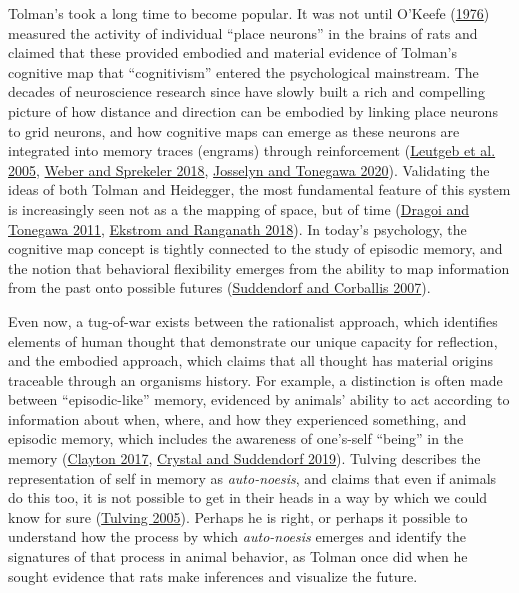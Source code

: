 \documentclass[twoside,12pt,final]{ucthesis-CA2012}
\begin{document}
\begin{ucmainmatter}
Tolman's took a long time to become popular. It was not until O'Keefe (\protect\hyperlink{ref-okeefe1976}{1976}) measured the activity of individual ``place neurons'' in the brains of rats and claimed that these provided embodied and material evidence of Tolman's cognitive map that ``cognitivism'' entered the psychological mainstream. The decades of neuroscience research since have slowly built a rich and compelling picture of how distance and direction can be embodied by linking place neurons to grid neurons, and how cognitive maps can emerge as these neurons are integrated into memory traces (engrams) through reinforcement (\protect\hyperlink{ref-leutgeb2005}{Leutgeb et al. 2005}, \protect\hyperlink{ref-weber2018}{Weber and Sprekeler 2018}, \protect\hyperlink{ref-josselyn2020}{Josselyn and Tonegawa 2020}). Validating the ideas of both Tolman and Heidegger, the most fundamental feature of this system is increasingly seen not as a the mapping of space, but of time (\protect\hyperlink{ref-dragoi2011}{Dragoi and Tonegawa 2011}, \protect\hyperlink{ref-ekstrom2018}{Ekstrom and Ranganath 2018}). In today's psychology, the cognitive map concept is tightly connected to the study of episodic memory, and the notion that behavioral flexibility emerges from the ability to map information from the past onto possible futures (\protect\hyperlink{ref-suddendorf2007}{Suddendorf and Corballis 2007}).

Even now, a tug-of-war exists between the rationalist approach, which identifies elements of human thought that demonstrate our unique capacity for reflection, and the embodied approach, which claims that all thought has material origins traceable through an organisms history. For example, a distinction is often made between ``episodic-like'' memory, evidenced by animals' ability to act according to information about when, where, and how they experienced something, and episodic memory, which includes the awareness of one's-self ``being'' in the memory (\protect\hyperlink{ref-clayton2017}{Clayton 2017}, \protect\hyperlink{ref-crystal2019}{Crystal and Suddendorf 2019}). Tulving describes the representation of self in memory as \emph{auto-noesis}, and claims that even if animals do this too, it is not possible to get in their heads in a way by which we could know for sure (\protect\hyperlink{ref-tulving2005}{Tulving 2005}). Perhaps he is right, or perhaps it possible to understand how the process by which \emph{auto-noesis} emerges and identify the signatures of that process in animal behavior, as Tolman once did when he sought evidence that rats make inferences and visualize the future.


\end{ucmainmatter}
\end{document}
